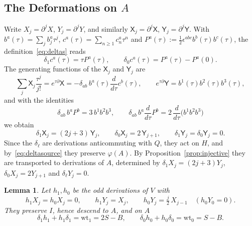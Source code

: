 \documentclass[11pt]{amsart}
\numberwithin{equation}{section}
\newtheorem{lemma}[theorem]{Lemma}
\theoremstyle{definition}
\theoremstyle{remark}
\newcommand{\dd}{\partial}
\newcommand{\Xc}{\mathsf{X}}
\newcommand{\Yc}{\mathsf{Y}}
\newcommand{\wt}{\mathrm{wt}}
\begin{document}
\subsection{The Deformations on \texorpdfstring{$A$}{A}}
Write $X_j=\dd^jX$, $Y_j=\dd^jY$, and similarly $\Xc_j=\dd^j\Xc$, $\Yc_j=\dd^j\Yc$. With $b^a(\tau)=\sum_jb_j^a\tau^j$, $c^a(\tau)=\sum_{n\ge1}c_n^a\tau^n$ and $P^a(\tau):=\frac12\epsilon^{abc}b^b(\tau)b^c(\tau)$, the definition~\eqref{eq:deltas} reads
\begin{equation}\label{eq:delta-gen}
\delta_1c^a(\tau)=\tau P^a(\tau),\qquad \delta_0c^a(\tau)=P^a(\tau)-P^a(0).
\end{equation}
The generating functions of the $\Xc_j$ and $\Yc_j$ are
\begin{equation}\label{eq:XY-gen-tau}
\sum_j\Xc_j\frac{\tau^j}{j!}=e^{\tau\dd}\Xc=-\delta_{ab}\,b^a(\tau)\frac{d}{d\tau}c^b(\tau),\qquad e^{\tau\dd}\Yc=b^1(\tau)b^2(\tau)b^3(\tau),
\end{equation}
and with the identities
\begin{equation}\label{eq:P-identities}
\delta_{ab}\,b^aP^b=3\,b^1b^2b^3,\qquad \delta_{ab}\,b^a\frac{d}{d\tau}P^b=2\,\frac{d}{d\tau}\bigl(b^1b^2b^3\bigr)
\end{equation}
we obtain
\begin{equation}\label{eq:deltasource}
\delta_1\Xc_j=(2j+3)\,\Yc_j,\qquad \delta_0\Xc_j=2\,\Yc_{j+1},\qquad \delta_1\Yc_j=\delta_0\Yc_j=0 .
\end{equation}
Since the $\delta_\ell$ are derivations anticommuting with $Q$, they act on $H$, and by~\eqref{eq:deltasource} they preserve $\varphi(A)$. By Proposition~\ref{prop:injective} they are transported to derivations of $A$, determined by $\delta_1X_j=(2j+3)Y_j$, $\delta_0X_j=2Y_{j+1}$ and $\delta_\ell Y_j=0$.

\begin{lemma}\label{lem:homotopy}
Let $h_1,h_0$ be the odd derivations of $V$ with
\begin{equation}\label{eq:h-def}
h_1X_j=h_0X_j=0,\qquad h_1Y_j=X_j,\qquad h_0Y_j=\tfrac j2\,X_{j-1}\quad(h_0Y_0=0).
\end{equation}
They preserve $I$, hence descend to $A$, and on $A$
\begin{equation}\label{eq:contractions}
\delta_1h_1+h_1\delta_1=\wt_1=2S-B,\qquad \delta_0h_0+h_0\delta_0=\wt_0=S-B .
\end{equation}
\end{lemma}
\end{document}
